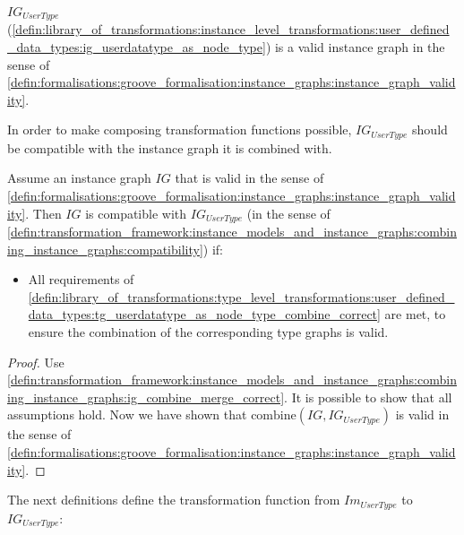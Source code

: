 \begin{thm}
\label{defin:library_of_transformations:instance_level_transformations:user_defined_data_types:ig_class_as_node_type_correct}
$IG_{UserType}$ (\cref{defin:library_of_transformations:instance_level_transformations:user_defined_data_types:ig_userdatatype_as_node_type}) is a valid instance graph in the sense of \cref{defin:formalisations:groove_formalisation:instance_graphs:instance_graph_validity}.
\end{thm}

In order to make composing transformation functions possible, $IG_{UserType}$ should be compatible with the instance graph it is combined with.

\begin{thm}
\label{defin:library_of_transformations:instance_level_transformations:user_defined_data_types:ig_userdatatype_as_node_type_combine_correct}
Assume an instance graph $IG$ that is valid in the sense of \cref{defin:formalisations:groove_formalisation:instance_graphs:instance_graph_validity}. Then $IG$ is compatible with $IG_{UserType}$ (in the sense of \cref{defin:transformation_framework:instance_models_and_instance_graphs:combining_instance_graphs:compatibility}) if:
\begin{itemize}
    \item All requirements of \cref{defin:library_of_transformations:type_level_transformations:user_defined_data_types:tg_userdatatype_as_node_type_combine_correct} are met, to ensure the combination of the corresponding type graphs is valid.
\end{itemize}
\end{thm}

\begin{proof}
Use \cref{defin:transformation_framework:instance_models_and_instance_graphs:combining_instance_graphs:ig_combine_merge_correct}. It is possible to show that all assumptions hold. Now we have shown that $\mathrm{combine}(IG, IG_{UserType})$ is valid in the sense of \cref{defin:formalisations:groove_formalisation:instance_graphs:instance_graph_validity}.
\end{proof}

The next definitions define the transformation function from $Im_{UserType}$ to $IG_{UserType}$:

